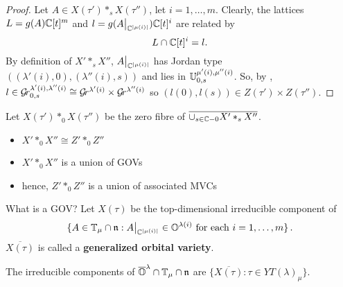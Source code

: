 \documentclass[draft]{article}
\begin{document}

\begin{proof}
    Let $A\in X(\tau')\ast_s X(\tau'')$, let $i = 1,\dots, m$.  
    Clearly, the lattices $L=g(A)\mathbb C[t]^m$ and $l=g(A\big|_{\mathbb C^{|\mu(i)|}})\mathbb C[t]^i$ are related by
    $$
    L\cap \mathbb C[t]^i = l. 
    $$
    By definition of $X'\ast_s X''$,  $A\big|_{\mathbb C^{|\mu(i)|}}$ has Jordan type $((\lambda'(i),0),(\lambda''(i),s))$ and lies in $\mathbb U^{\mu'(i),\mu''(i)}_{0,s}$. So, by , $l\in\mathcal{G}\!r_{0,s}^{\lambda'(i),\lambda''(i)} \cong \mathcal{G}\!r^{\lambda'(i)}\times \mathcal{G}\!r^{\lambda''(i)}$ so $(l(0),l(s))\in Z(\tau')\times Z(\tau'')$.
\end{proof}
Let $X(\tau')\ast_0 X(\tau'')$ be the zero fibre of $\overline{\cup_{s\in\mathbb C-0} X'\ast_s X''}$. 
\begin{itemize}
    \item $X'\ast_0 X'' \cong Z'\ast_0 Z''$ 
    \item $X'\ast_0 X''$ is a union of GOVs
    \item hence, $Z'\ast_0 Z''$ is a union of associated MVCs
\end{itemize}

What is a GOV? Let $X(\tau)$ be the top-dimensional  irreducible component of
\[
    \{
        A \in  \mathbb T_\mu\cap\mathfrak n : A\big|_{\mathbb C^{|\mu(i)|}} \in \mathbb O^{\lambda(i)} \text{ for each } i = 1,\dots,m
    \}\,. 
\]
$\overline{X(\tau)}$ is called a \textbf{generalized orbital variety}. 
% 
\begin{proposition}
    \label{pr:govsasirrecs}
    The irreducible components of $\overline{\mathbb O}^\lambda\cap\mathbb T_\mu\cap\mathfrak n$ are $\{\overline{X(\tau)} : \tau\in YT(\lambda)_\mu\}$. 
\end{proposition}
\end{document}

